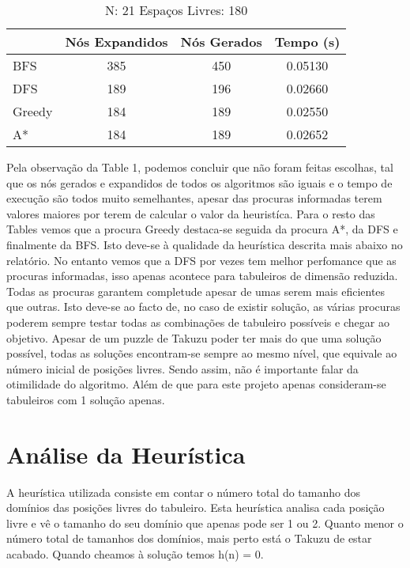 \documentclass[12pt,a4paper]{article}
\begin{document}
  \begin{table}[H]
    \caption{N: 21 Espaços Livres: 180}
    \label{tab:my-table3}
    \centering
    \begin{tabular}{lccc}
      & Nós Expandidos & Nós Gerados & Tempo (s) \\
      \hline
      BFS    & 385 & 450 & 0.05130 \\
      DFS    & 189 & 196 & 0.02660 \\
      Greedy & 184 & 189 & 0.02550 \\
      A*     & 184 & 189 & 0.02652 \\
    \hline
    \end{tabular}
  \end{table}

  Pela observação da Table 1, podemos concluir que não foram feitas escolhas, tal que os nós gerados e expandidos de todos os algoritmos são iguais e o tempo de execução são todos muito semelhantes, apesar das procuras informadas terem valores maiores por terem de calcular o valor da heuristíca.
  Para o resto das Tables vemos que a procura Greedy destaca-se seguida da procura A*, da DFS e finalmente da BFS.
  Isto deve-se à qualidade da heurística descrita mais abaixo no relatório.
  No entanto vemos que a DFS por vezes tem melhor perfomance que as procuras informadas, isso apenas acontece para tabuleiros de dimensão reduzida. 
  Todas as procuras garantem completude apesar de umas serem mais eficientes que outras. Isto deve-se ao facto de, no caso de existir solução, as várias procuras poderem sempre testar todas as combinações de tabuleiro possíveis e chegar ao objetivo.
  Apesar de um puzzle de Takuzu poder ter mais do que uma solução possível, todas as soluções encontram-se sempre ao mesmo nível, que equivale ao número inicial de posições livres. Sendo assim, não é importante falar da otimilidade do algoritmo.
  Além de que para este projeto apenas consideram-se tabuleiros com 1 solução apenas.
  
  \section{Análise da Heurística}

  A heurística utilizada consiste em contar o número total do tamanho dos domínios das posições livres do tabuleiro.
  Esta heurística analisa cada posição livre e vê o tamanho do seu domínio que apenas pode ser 1 ou 2.
  Quanto menor o número total de tamanhos dos domínios, mais perto está o Takuzu de estar acabado.
  Quando cheamos à solução temos h(n) = 0.
  
\end{document}
